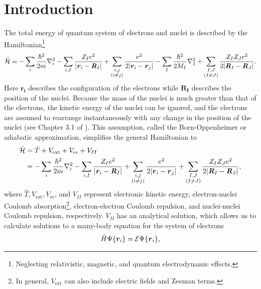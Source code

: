 \section{Introduction}
The total energy of quantum system of electrons and nuclei is described by the
Hamiltonian\footnote{Neglecting relativistic, magnetic, and quantum
electrodynamic effects.}
%
 \begin{equation}\label{generalhen}
\mathcal{\hat H}=-\sum_i\frac{\hbar^2}{2m}\nabla_i^2-
\sum_{i,I}\frac{Z_Ie^2}{|\textbf{\textit r}_i-\textbf{\textit R}_I|}+
\sum_{\substack{i,j\\(i\neq j)}}\frac{e^2}{2|\textbf{\textit r}_i-\textbf{\textit r}_j|}-
\sum_I\frac{\hbar^2}{2M_I}\nabla_I^2+
\sum_{\substack{I,J\\(I\neq J)}}\frac{Z_IZ_Je^2}{2|\textbf{\textit R}_I-\textbf{\textit R}_J|}.
\end{equation}
%
Here $\mathbf{r_i}$ describes the configuration of the electrons while $\mathbf{R_I}$ describes the position
of the nuclei.  Because the mass of the nuclei is much greater than that of the
electrons, the kinetic energy of the nuclei can be ignored, and the electrons are
assumed to rearrange instantaneously with any change in the position of the nuclei
(see Chapter 3.1 of \cite{martin-esbook}). This assumption, called the
Born-Oppenheimer or adiabatic approximation, simplifies the general Hamiltonian to
%
\begin{equation}\label{generalhee}
\begin{aligned}
\mathcal{\hat H}&=\hat{T}+V_\text{ext}+V_\text{ee}+V_{II} \\
&=-\sum_i\frac{\hbar^2}{2m}\nabla_i^2-
\sum_{i,I}\frac{Z_Ie^2}{|\textbf{\textit r}_i-\textbf{\textit R}_I|}+
\sum_{\substack{i,j\\(i\neq j)}}\frac{e^2}{2|\textbf{\textit r}_i-\textbf{\textit r}_j|}+
\sum_{\substack{I,J\\(I\neq J)}}\frac{Z_IZ_Je^2}{2|\textbf{\textit R}_I-\textbf{\textit R}_J|},
\end{aligned}
\end{equation}
%
where $\hat{T}, V_\text{ext}, V_\text{ee}$, and $V_{II}$ represent electronic kinetic
energy, electron-nuclei Coulomb absorption\footnote{In general, $V_\text{ext}$ can
also include electric fields and Zeeman terms.}, electron-electron Coulomb repulsion,
and nuclei-nuclei Coulomb repulsion, respectively. $V_{II}$ has an analytical
solution, which allows us to calculate solutions to a many-body equation for the system of electrons 
%
\begin{equation}\label{generaleeq}
\begin{aligned}
\hat{H}\Psi\{\textbf{\textit r}_i\}=\mathcal{E}\Psi\{\textbf{\textit r}_i\}, 
\end{aligned}
\end{equation}
